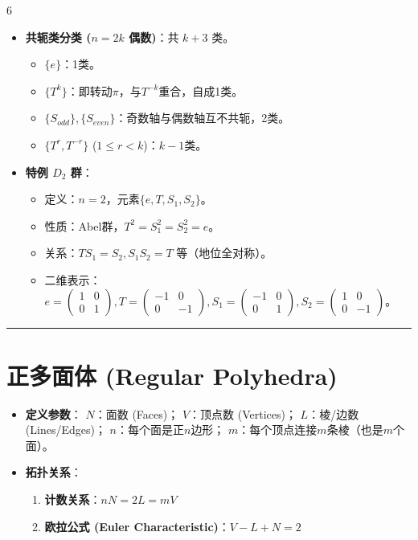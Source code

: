 \documentclass[landscape]{article}
\begin{document}
\begin{multicols*}{6}
\begin{itemize}
\begin{itemize}
  \end{itemize}
  \item \textbf{共轭类分类 ($n=2k$ 偶数)}：共 $k+3$ 类。
  \begin{itemize}
      \item $\{e\}$：1类。
      \item $\{T^k\}$：即转动$\pi$，与$T^{-k}$重合，自成1类。
      \item $\{S_{odd}\}, \{S_{even}\}$：奇数轴与偶数轴互不共轭，2类。
      \item $\{T^r, T^{-r}\}$ ($1\le r < k$)：$k-1$类。
  \end{itemize}
  \item \textbf{特例 $D_2$ 群}：
  \begin{itemize}
      \item 定义：$n=2$，元素$\{e, T, S_1, S_2\}$。
      \item 性质：Abel群，$T^2=S_1^2=S_2^2=e$。
      \item 关系：$TS_1=S_2, S_1S_2=T$ 等（地位全对称）。
      \item 二维表示：$e=(\begin{smallmatrix}1&0\\0&1\end{smallmatrix}), T=(\begin{smallmatrix}-1&0\\0&-1\end{smallmatrix}), S_1=(\begin{smallmatrix}-1&0\\0&1\end{smallmatrix}), S_2=(\begin{smallmatrix}1&0\\0&-1\end{smallmatrix})$。
  \end{itemize}
\end{itemize}
\noindent\textcolor{red}{\rule{\linewidth}{1pt}}
\section*{正多面体 (Regular Polyhedra)}
\begin{itemize}
  \item \textbf{定义参数}：
  $N$：面数 (Faces)；
  $V$：顶点数 (Vertices)；
  $L$：棱/边数 (Lines/Edges)；
  $n$：每个面是正$n$边形；
  $m$：每个顶点连接$m$条棱（也是$m$个面）。
  \item \textbf{拓扑关系}：
  \begin{enumerate}
      \item \textbf{计数关系}：$nN = 2L = mV$
      \item \textbf{欧拉公式 (Euler Characteristic)}：$V - L + N = 2$
  \end{enumerate}
\end{itemize}


\end{multicols*}
\end{document}
